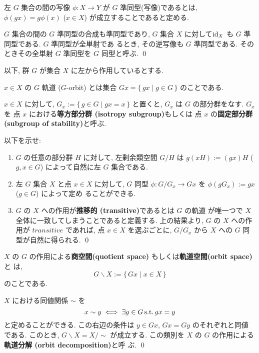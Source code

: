 \documentclass[12pt,twoside]{jarticle}
\def\suchthat{\mathop{\text{\rm s.t.}}}
\def\id{\text{\rm id}}
\begin{document}
左 $G$ 集合の間の写像 $\phi:X\to Y$ が $G$ 準同型(写像)であるとは, 
$\phi(gx) = g\phi(x)$ ($x\in X$) が成立することであると定める.

\begin{question}
  $G$ 集合の間の $G$ 準同型の合成も準同型であり, 
  $G$ 集合 $X$ に対して$\id_X$ も $G$ 準同型である.  $G$ 準同型が全単射であ
  るとき, その逆写像も $G$ 準同型である. そのときその全単射 $G$ 準同型を $G$
  同型と呼ぶ. \qed
\end{question}

以下, 群 $G$ が集合 $X$ に左から作用しているとする.

$x\in X$ の $G$ 軌道 ($G$-orbit) とは集合 %
$Gx = \{\, gx \mid g\in G \,\}$ のことである.

$x\in X$ に対して, $G_x := \{\,g\in G\mid gx=x\,\}$ と置くと, $G_x$ は $G$ 
の部分群をなす. $G_x$ を
点 $x$ における{\bf 等方部分群 (isotropy subgroup)}もしくは
点 $x$ の{\bf 固定部分群 (subgroup of stability)}と呼ぶ.

\begin{question}[軌道と剰余類空間の同型]
  以下を示せ:
  \begin{enumerate}
  \item $G$ の任意の部分群 $H$ に対して, 左剰余類空間 $G/H$ は %
    $g(xH) := (gx)H$ ($g,x\in G$) によって自然に左 $G$ 集合である.
  \item 左 $G$ 集合 $X$ と点 $x\in X$ に対して, 
    $G$ 同型 $\phi:G/G_x\to Gx$ を $\phi(gG_x):=gx$ ($g\in G$) によって定め
    ることができる.
  \item $G$ の $X$ への作用が{\bf 推移的 (transitive)}であるとは $G$ の軌道
    が唯一つで $X$ 全体に一致してしまうことであると定義する. 上の結果より,
    $G$ の $X$ への作用が $transitive$ であれば, 点 $x\in X$ を選ぶごとに,
    $G/G_x$ から $X$ への $G$ 同型が自然に得られる.
    \qed
  \end{enumerate}
\end{question}

$X$ の $G$ の作用による{\bf 商空間(quotient space)}
もしくは{\bf 軌道空間(orbit space)}と
は,
\begin{equation*}
  G\backslash X := \{\, Gx \mid x \in X \,\}
\end{equation*}
のことである.

\begin{question}
  $X$ における同値関係 $\sim$ を
  \begin{equation*}
    x \sim y \iff \exists g\in G \suchthat gx = y
  \end{equation*}
  と定めることができる. この右辺の条件は $y\in Gx$, $Gx=Gy$ のそれぞれと同値
  である. このとき, $G\backslash X = X/{\sim}$ が成立する. 
  この類別を $X$ の $G$ の作用による{\bf 軌道分解 (orbit decomposition)}と呼
  ぶ.
  \qed
\end{question}
\end{document}
